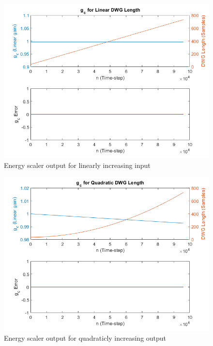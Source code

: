 \documentclass[../main.tex]{subfiles}
\begin{document}
\begin{figure}[h]
    \centering
    \includegraphics[scale=.65]{./images/plots/EnergyScalerLinearIncreasing.png}
    \caption{Energy scaler output for linearly increasing input}
    \label{fig:EnergyScalerLinInc}
\end{figure}

\begin{figure}[h]
    \centering
    \includegraphics[scale=.65]{./images/plots/EnergyScalerQuadraticIncreasing.png}
    \caption{Energy scaler output for quadraticly increasing output}
    \label{fig:EnergyScalerQuadInc}
\end{figure}
\end{document}
